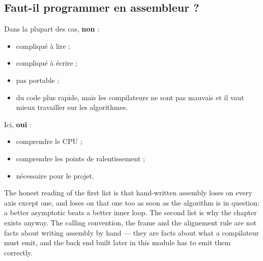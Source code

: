 \subsection{Faut-il programmer en assembleur ?}
\begin{conclusion}
  Dans la plupart des cas, \textbf{non} :
  \begin{itemize}
    \item compliqué à lire ;
    \item compliqué à écrire ;
    \item pas portable ;
    \item du code plus rapide, mais les compilateurs ne sont pas mauvais et il
      vaut mieux travailler sur les algorithmes.
  \end{itemize}
  Ici, \textbf{oui} :
  \begin{itemize}
    \item comprendre le CPU ;
    \item comprendre les points de ralentissement ;
    \item nécessaire pour le projet.
  \end{itemize}
\end{conclusion}

The honest reading of the first list is that hand-written assembly loses on
every axis except one, and loses on that one too as soon as the algorithm is in
question: a better asymptotic beats a better inner loop. The second list is why
the chapter exists anyway. The calling convention, the frame and the alignement
rule are not facts about writing assembly by hand --- they are facts about what
a compilateur must emit, and the back end built later in this module has to emit
them correctly.
